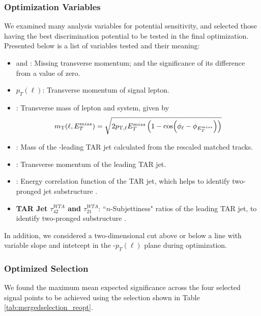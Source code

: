 \subsubsection{Optimization Variables}
We examined many analysis variables for potential sensitivity, and selected those having the best discrimination potential to be tested in the final optimization. Presented below is a list of variables tested and their meaning:

\begin{itemize}
  \item \textbf{\met} and \metsig: Missing transverse momentum; and the significance of its difference from a value of zero.
  \item \textbf{$p_T(\ell)$}: Transverse momentum of signal lepton.
  \item \textbf{\mtlepmet}: Transverse mass of lepton and \met system, given by
  \begin{equation}
  m_{\text{T}}(\ell, E_{T}^{miss}) = \sqrt{2 p_{\text{T},\ell} E_{T}^{miss} \left( 1 - \cos(\phi_\ell - \phi_{E_{T}^{miss}}) \right) }
  \end{equation}
  \item \textbf{\mTAR}: Mass of the \pT-leading TAR jet calculated from the rescaled matched tracks.
  \item \textbf{\ptTAR}: Transverse momentum of the leading TAR jet.
  \item \textbf{\DtwoTAR}: Energy correlation function of the TAR jet, which helps to identify two-pronged jet substructure \cite{DTwo}.
  \item \textbf{TAR Jet $\tau_{42}^{WTA}$ and $\tau_{21}^{WTA}$}: ``$n$-Subjettiness" ratios of the leading TAR jet, to identify two-pronged substructure \cite{Tau42}.
\end{itemize}

In addition, we considered a two-dimensional cut above or below a line with variable slope and intetcept in the \met-$p_T(\ell)$ plane during optimization.

\subsubsection{Optimized Selection}

We found the maximum mean expected significance across the four selected signal points to be achieved using the selection shown in Table \ref{tab:mergedselection_reopt}.

